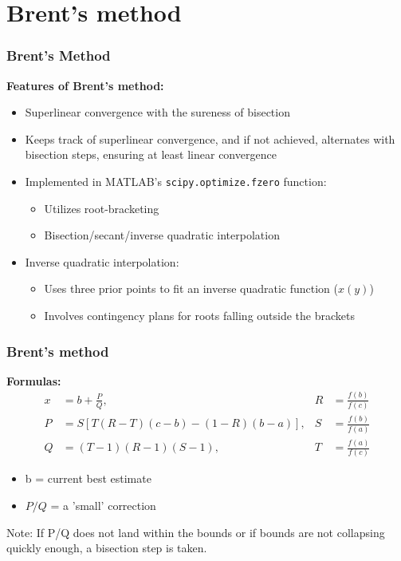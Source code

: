 \section{Brent's method}
\begin{frame}[fragile]
    \frametitle{Brent's Method}

    \textbf{Features of Brent's method:}
    \begin{itemize}
        \item Superlinear convergence with the sureness of bisection
        \item Keeps track of superlinear convergence, and if not achieved, alternates with bisection steps, ensuring at least linear convergence
        \item Implemented in MATLAB's \texttt{scipy.optimize.fzero} function:
        \begin{itemize}
            \item Utilizes root-bracketing
            \item Bisection/secant/inverse quadratic interpolation
        \end{itemize}
        \item Inverse quadratic interpolation:
        \begin{itemize}
            \item Uses three prior points to fit an inverse quadratic function ($x(y)$)
            \item Involves contingency plans for roots falling outside the brackets
        \end{itemize}
    \end{itemize}

\end{frame}

\begin{frame}[fragile]
  \frametitle{Brent's method}
  \textbf{Formulas:}
  \begin{align*}
    x &= b + \frac{P}{Q}, & R &= \frac{f(b)}{f(c)} \\
    P &= S\left[T(R-T)(c-b) - (1-R)(b-a)\right], & S &= \frac{f(b)}{f(a)} \\
    Q &= (T-1)(R-1)(S-1), & T &= \frac{f(a)}{f(c)}
    \end{align*}
    \begin{itemize}
      \item b = current best estimate
      \item $P/Q$ = a 'small' correction
    \end{itemize}
    Note: If P/Q does not land within the bounds or if bounds are not collapsing quickly enough, a bisection step is taken.
\end{frame}

